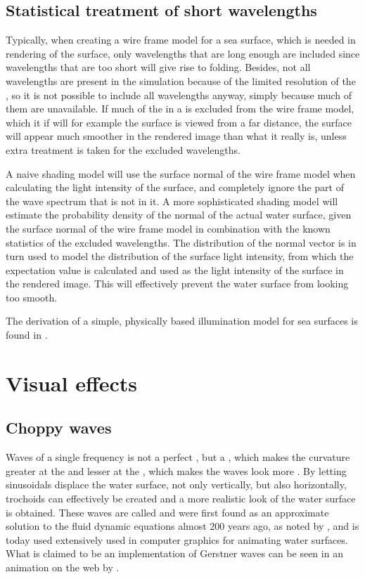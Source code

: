 \subsection{Statistical treatment of short wavelengths}

Typically, when creating a wire frame model for a sea surface, which is needed in rendering of the surface, only wavelengths that are long enough are included since wavelengths that are too short will give rise to folding. Besides, not all wavelengths are present in the simulation because of the limited resolution of the \grid, so it is not possible to include all wavelengths anyway, simply because much of them are unavailable. If much of the  in a  is excluded from the wire frame model, which it if will for example the surface is viewed from a far distance, the surface will appear much smoother in the rendered image than what it really is, unless extra treatment is taken for the excluded wavelengths.

A naive shading model will use the surface normal of the wire frame model when calculating the light intensity of the surface, and completely ignore the part of the wave spectrum that is not in it. A more sophisticated shading model will estimate the probability density of the normal of the actual water surface, given the surface normal of the wire frame model in combination with the known statistics of the excluded wavelengths. The distribution of the normal vector is in turn used to model the distribution of the surface light intensity, from which the expectation value is calculated and used as the light intensity of the surface in the rendered image. This will effectively prevent the water surface from looking too smooth.

The derivation of a simple, physically based illumination model for sea surfaces is found in .
\section{Visual effects}

\subsection{Choppy waves}

Waves of a single frequency is not a perfect \sinusoidal, but a \trochoid, which makes the curvature greater at the  and lesser at the , which makes the waves look more . By letting sinusoidals displace the water surface, not only vertically, but also horizontally, trochoids can effectively be created and a more realistic look of the water surface is obtained. These waves are called  and were first found as an approximate solution to the fluid dynamic equations almost 200 years ago, as noted by \citet{Tessendorf2001}, and is today used extensively used in computer graphics for animating water surfaces. What is claimed to be an implementation of Gerstner waves can be seen in an animation on the web by \citet{ceribral2012}.

